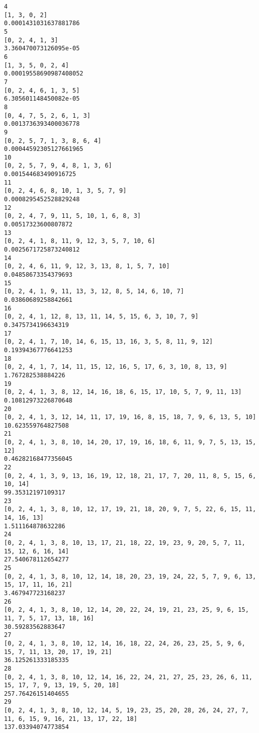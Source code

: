\documentclass[11pt]{article}
\begin{document}
    \begin{Verbatim}[commandchars=\\\{\}]
4
[1, 3, 0, 2]
0.0001431031637881786
5
[0, 2, 4, 1, 3]
3.360470073126095e-05
6
[1, 3, 5, 0, 2, 4]
0.00019558690987408052
7
[0, 2, 4, 6, 1, 3, 5]
6.305601148450082e-05
8
[0, 4, 7, 5, 2, 6, 1, 3]
0.0013736393400036778
9
[0, 2, 5, 7, 1, 3, 8, 6, 4]
0.00044592305127661965
10
[0, 2, 5, 7, 9, 4, 8, 1, 3, 6]
0.001544683490916725
11
[0, 2, 4, 6, 8, 10, 1, 3, 5, 7, 9]
0.0008295452528829248
12
[0, 2, 4, 7, 9, 11, 5, 10, 1, 6, 8, 3]
0.00517323600807872
13
[0, 2, 4, 1, 8, 11, 9, 12, 3, 5, 7, 10, 6]
0.0025671725873240812
14
[0, 2, 4, 6, 11, 9, 12, 3, 13, 8, 1, 5, 7, 10]
0.04858673354379693
15
[0, 2, 4, 1, 9, 11, 13, 3, 12, 8, 5, 14, 6, 10, 7]
0.03860689258842661
16
[0, 2, 4, 1, 12, 8, 13, 11, 14, 5, 15, 6, 3, 10, 7, 9]
0.3475734196634319
17
[0, 2, 4, 1, 7, 10, 14, 6, 15, 13, 16, 3, 5, 8, 11, 9, 12]
0.19394367776641253
18
[0, 2, 4, 1, 7, 14, 11, 15, 12, 16, 5, 17, 6, 3, 10, 8, 13, 9]
1.767282538884226
19
[0, 2, 4, 1, 3, 8, 12, 14, 16, 18, 6, 15, 17, 10, 5, 7, 9, 11, 13]
0.10812973226870648
20
[0, 2, 4, 1, 3, 12, 14, 11, 17, 19, 16, 8, 15, 18, 7, 9, 6, 13, 5, 10]
10.623559764827508
21
[0, 2, 4, 1, 3, 8, 10, 14, 20, 17, 19, 16, 18, 6, 11, 9, 7, 5, 13, 15, 12]
0.46282168477356045
22
[0, 2, 4, 1, 3, 9, 13, 16, 19, 12, 18, 21, 17, 7, 20, 11, 8, 5, 15, 6, 10, 14]
99.35312197109317
23
[0, 2, 4, 1, 3, 8, 10, 12, 17, 19, 21, 18, 20, 9, 7, 5, 22, 6, 15, 11, 14, 16, 13]
1.511164878632286
24
[0, 2, 4, 1, 3, 8, 10, 13, 17, 21, 18, 22, 19, 23, 9, 20, 5, 7, 11, 15, 12, 6, 16, 14]
27.540678112654277
25
[0, 2, 4, 1, 3, 8, 10, 12, 14, 18, 20, 23, 19, 24, 22, 5, 7, 9, 6, 13, 15, 17, 11, 16, 21]
3.467947723168237
26
[0, 2, 4, 1, 3, 8, 10, 12, 14, 20, 22, 24, 19, 21, 23, 25, 9, 6, 15, 11, 7, 5, 17, 13, 18, 16]
30.59283562883647
27
[0, 2, 4, 1, 3, 8, 10, 12, 14, 16, 18, 22, 24, 26, 23, 25, 5, 9, 6, 15, 7, 11, 13, 20, 17, 19, 21]
36.125261333185335
28
[0, 2, 4, 1, 3, 8, 10, 12, 14, 16, 22, 24, 21, 27, 25, 23, 26, 6, 11, 15, 17, 7, 9, 13, 19, 5, 20, 18]
257.76426151404655
29
[0, 2, 4, 1, 3, 8, 10, 12, 14, 5, 19, 23, 25, 20, 28, 26, 24, 27, 7, 11, 6, 15, 9, 16, 21, 13, 17, 22, 18]
137.03394074773854

    \end{Verbatim}

    \begin{center}
    \end{center}
    { \hspace*{\fill} \\}
    

    
    
    
    
\end{document}
